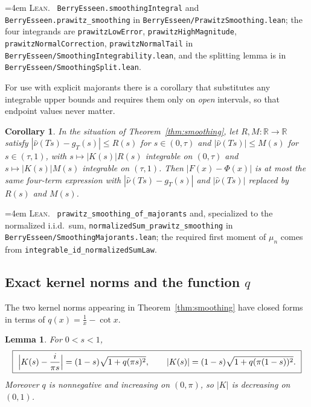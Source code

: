 \documentclass[10pt,a4paper]{article}
\theoremstyle{plain}
\newtheorem{lemma}[theorem]{Lemma}
\newtheorem{corollary}[theorem]{Corollary}
\theoremstyle{definition}
\newcommand{\R}{\mathbb{R}}
\newcommand{\lean}[1]{\texttt{#1}}
\newcommand{\file}[1]{\texttt{#1}}
\newenvironment{leanref}%
  {\par\addvspace{3pt}\begingroup\sloppy\emergencystretch=4em
   \noindent\footnotesize\textsc{Lean.}\ \ignorespaces}%
  {\par\endgroup\addvspace{3pt}}
\begin{document}
\begin{leanref}
\lean{BerryEsseen.smoothingIntegral} and
\lean{BerryEsseen.prawitz\_smoothing} in
\file{BerryEsseen/PrawitzSmoothing.lean}; the four integrands are
\lean{prawitzLowError}, \lean{prawitzHighMagnitude},
\lean{prawitzNormalCorrection}, \lean{prawitzNormalTail} in
\file{BerryEsseen/SmoothingIntegrability.lean}, and the splitting lemma is in
\file{BerryEsseen/SmoothingSplit.lean}.
\end{leanref}

For use with explicit majorants there is a corollary that substitutes any
integrable upper bounds and requires them only on \emph{open} intervals, so
that endpoint values never matter.

\begin{corollary}\label{cor:majorant-form}
In the situation of Theorem~\ref{thm:smoothing}, let $R,M:\R\to\R$ satisfy
$|\hat\nu(Ts)-g_T(s)|\le R(s)$ for $s\in(0,\tau)$ and
$|\hat\nu(Ts)|\le M(s)$ for $s\in(\tau,1)$, with
$s\mapsto|K(s)|R(s)$ integrable on $(0,\tau)$ and $s\mapsto|K(s)|M(s)$
integrable on $(\tau,1)$. Then $|F(x)-\Phi(x)|$ is at most the same four-term
expression with $|\hat\nu(Ts)-g_T(s)|$ and $|\hat\nu(Ts)|$ replaced by
$R(s)$ and $M(s)$.
\end{corollary}

\begin{leanref}
\lean{prawitz\_smoothing\_of\_majorants} and, specialized to the normalized
i.i.d.\ sum, \lean{normalizedSum\_prawitz\_smoothing} in
\file{BerryEsseen/SmoothingMajorants.lean}; the required first moment of
$\mu_n$ comes from \lean{integrable\_id\_normalizedSumLaw}.
\end{leanref}

\subsection{Exact kernel norms and the function $q$}
\label{sec:kernel-norms}

The two kernel norms appearing in Theorem~\ref{thm:smoothing} have closed forms
in terms of $q(x)=\tfrac1x-\cot x$.

\begin{lemma}\label{lem:kernel-norms}
For $0<s<1$,
\[
  \boxed{\
  \Bigl|K(s)-\frac{i}{\pi s}\Bigr| = (1-s)\sqrt{1+q(\pi s)^2},
  \qquad
  |K(s)| = (1-s)\sqrt{1+q(\pi(1-s))^2}. \ }
\]
Moreover $q$ is nonnegative and increasing on $(0,\pi)$, so $|K|$ is
decreasing on $(0,1)$.
\end{lemma}
\end{document}
